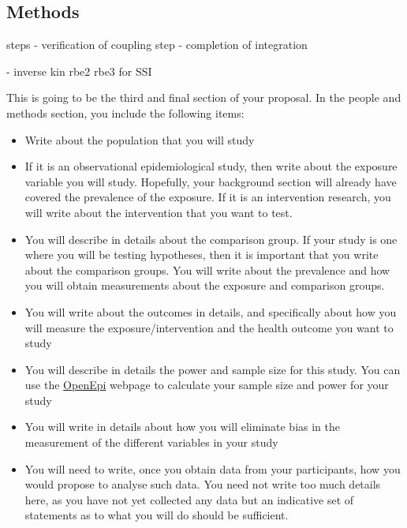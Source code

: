 \documentclass[a4paper]{article}
\begin{document}
\subsection*{Methods}


steps
- verification of coupling step
- completion of integration


- inverse kin rbe2 rbe3 for SSI





This is going to be the third and final section of your proposal. In the people and methods section, you include the following items:

\begin{itemize}
\item Write about the population that you will study
\item If it is an observational epidemiological study, then write about the exposure variable you will study. Hopefully, your background section will already have covered the prevalence of the exposure. If it is an intervention research, you will write about the intervention that you want to test.
\item You will describe in details about the comparison group. If your study is one where you will be testing hypotheses, then it is important that you write about the comparison groups. You will write about the prevalence and how you will obtain measurements about the exposure and comparison groups.
\item You will write about the outcomes in details, and specifically about how you will measure the exposure/intervention and the health outcome you want to study
\item You will describe in details the power and sample size for this study. You can use the \href{http://www.openepi.com/Menu/OE_Menu.htm}{OpenEpi} webpage to calculate your sample size and power for your study
\item You will write in details about how you will eliminate bias in the measurement of the different variables in your study
\item You will need to write, once you obtain data from your participants, how you would propose to analyse such data. You need not write too much details here, as you have not yet collected any data but an indicative set of statements as to what you will do should be sufficient. 
\end{itemize}
\end{document}
